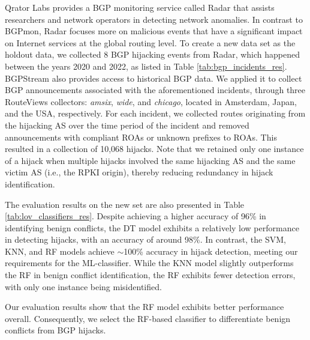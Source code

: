 Qrator Labs \cite{QratorLab} provides a BGP monitoring service called Radar that assists researchers and network operators in detecting network anomalies. In contrast to BGPmon, Radar focuses more on malicious events that have a significant impact on Internet services at the global routing level. To create a new data set as the holdout data, we collected 8 BGP hijacking events from Radar, which happened between the years 2020 and 2022, as listed in Table \ref{tab:bgp_incidents_res}. BGPStream also provides access to historical BGP data. We applied it to collect BGP announcements associated with the aforementioned incidents, through three RouteViews collectors: \textit{amsix}, \textit{wide}, and \textit{chicago}, located in Amsterdam, Japan, and the USA, respectively.
For each incident, we collected routes originating from the hijacking AS over the time period of the incident and removed announcements with compliant ROAs or unknown prefixes to ROAs.
This resulted in a collection of 10,068 hijacks.
Note that we retained only one instance of a hijack when multiple hijacks involved the same hijacking AS and the same victim AS (i.e., the RPKI origin), thereby reducing redundancy in hijack identification.

The evaluation results on the new set are also presented in Table \ref{tab:lov_classifiers_res}.
Despite achieving a higher accuracy of 96\% in identifying benign conflicts, the DT model exhibits a relatively low performance in detecting hijacks, with an accuracy of around 98\%. In contrast, the SVM, KNN, and RF models achieve $\sim$100\% accuracy in hijack detection, meeting our requirements for the ML-classifier.
While the KNN model slightly outperforms the RF in benign conflict identification, the RF exhibits fewer detection errors, with only one instance being misidentified.

Our evaluation results show that the RF model exhibits better performance overall. Consequently, we select the RF-based classifier to differentiate benign conflicts from BGP hijacks.


